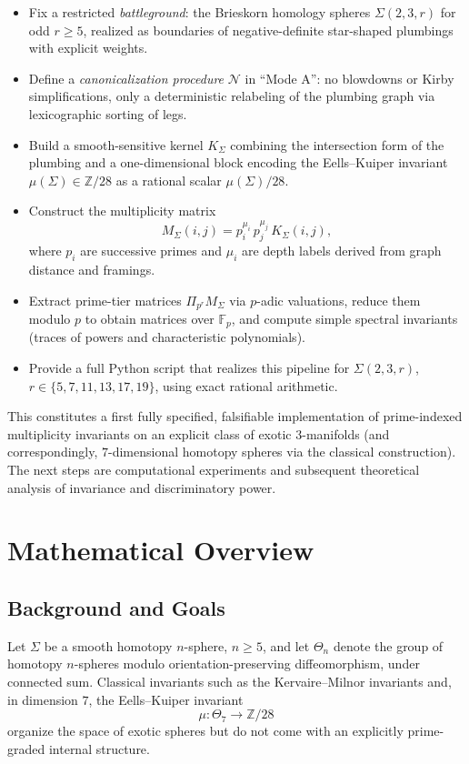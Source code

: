 \documentclass[11pt]{article}
\begin{document}
\begin{itemize}[leftmargin=1.5em]
  \item Fix a restricted \emph{battleground}: the Brieskorn homology spheres $\Sigma(2,3,r)$ for odd $r\ge 5$, realized as boundaries of negative-definite star-shaped plumbings with explicit weights.\cite{exotic-mult}
  \item Define a \emph{canonicalization procedure} $\mathcal N$ in ``Mode A'': no blowdowns or Kirby simplifications, only a deterministic relabeling of the plumbing graph via lexicographic sorting of legs.
  \item Build a smooth-sensitive kernel $K_\Sigma$ combining the intersection form of the plumbing and a one-dimensional block encoding the Eells--Kuiper invariant $\mu(\Sigma)\in\mathbb Z/28$ as a rational scalar $\mu(\Sigma)/28$.\cite{exotic-mult}
  \item Construct the multiplicity matrix
  \[
    M_\Sigma(i,j) = p_i^{\mu_i}\,p_j^{\mu_j}\,K_\Sigma(i,j),
  \]
  where $p_i$ are successive primes and $\mu_i$ are depth labels derived from graph distance and framings.\cite{exotic-mult}
  \item Extract prime-tier matrices $\Pi_{p^r}M_\Sigma$ via $p$-adic valuations, reduce them modulo $p$ to obtain matrices over $\mathbb F_p$, and compute simple spectral invariants (traces of powers and characteristic polynomials).
  \item Provide a full Python script that realizes this pipeline for $\Sigma(2,3,r)$, $r\in\{5,7,11,13,17,19\}$, using exact rational arithmetic.
\end{itemize}

This constitutes a first fully specified, falsifiable implementation of prime-indexed multiplicity invariants on an explicit class of exotic $3$-manifolds (and correspondingly, $7$-dimensional homotopy spheres via the classical construction). The next steps are computational experiments and subsequent theoretical analysis of invariance and discriminatory power.

\section{Mathematical Overview}

\subsection{Background and Goals}

Let $\Sigma$ be a smooth homotopy $n$-sphere, $n\ge 5$, and let $\Theta_n$ denote the group of homotopy $n$-spheres modulo orientation-preserving diffeomorphism, under connected sum.\cite{exotic-mult} Classical invariants such as the Kervaire--Milnor invariants and, in dimension $7$, the Eells--Kuiper invariant
\[
  \mu : \Theta_7 \to \mathbb Z/28
\]
organize the space of exotic spheres but do not come with an explicitly prime-graded internal structure.\cite{exotic-mult}
\end{document}
